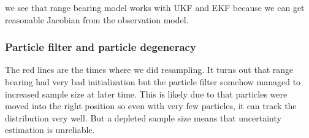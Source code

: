\documentclass{article}
\begin{document}
we see that range bearing model works with UKF and EKF because we can get reasonable Jacobian from the observation model.






\subsubsection{Particle filter and particle degeneracy}




The red lines are the times where we did resampling. It turns out that range bearing had very bad initialization but the particle filter somehow managed to increased sample size at later time. This is likely due to that particles were moved into the right position so even with very few particles, it can track the distribution very well. But a depleted sample size means that uncertainty estimation is unreliable. 



\end{document}
